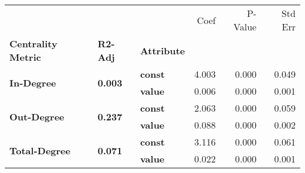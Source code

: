 \begin{tabular}{lllrrr}
\toprule
             &       &       &  Coef &  P-Value &  Std Err \\
\textbf{Centrality Metric} & \textbf{R2-Adj} & \textbf{Attribute} &       &          &          \\
\midrule
\multirow{2}{*}{\textbf{In-Degree}} & \multirow{2}{*}{\textbf{0.003}} & \textbf{const} & 4.003 &    0.000 &    0.049 \\
             &       & \textbf{value} & 0.006 &    0.000 &    0.001 \\
\cline{1-6}
\cline{2-6}
\multirow{2}{*}{\textbf{Out-Degree}} & \multirow{2}{*}{\textbf{0.237}} & \textbf{const} & 2.063 &    0.000 &    0.059 \\
             &       & \textbf{value} & 0.088 &    0.000 &    0.002 \\
\cline{1-6}
\cline{2-6}
\multirow{2}{*}{\textbf{Total-Degree}} & \multirow{2}{*}{\textbf{0.071}} & \textbf{const} & 3.116 &    0.000 &    0.061 \\
             &       & \textbf{value} & 0.022 &    0.000 &    0.001 \\
\bottomrule
\end{tabular}
